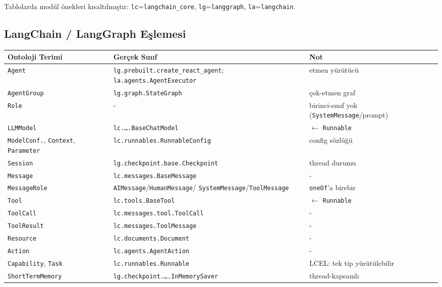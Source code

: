 \documentclass[10pt, a4paper, twocolumn]{article}
\begin{document}
\noindent Tablolarda modül önekleri kısaltılmıştır: \texttt{lc}=\texttt{langchain\_core}, \texttt{lg}=\texttt{langgraph}, \texttt{la}=\texttt{langchain}.

\subsection*{LangChain / LangGraph Eşlemesi}

\begin{center}
\tiny
\setlength{\tabcolsep}{3pt}
\begin{tabular}{|p{1.4cm}|p{3.4cm}|p{2.2cm}|}
\hline
\textbf{Ontoloji Terimi} & \textbf{Gerçek Sınıf} & \textbf{Not} \\
\hline
\texttt{Agent} & \texttt{lg.prebuilt.create\_react\_agent}; \texttt{la.agents.AgentExecutor} & etmen yürütücü \\
\hline
\texttt{AgentGroup} & \texttt{lg.graph.StateGraph} & çok-etmen graf \\
\hline
\texttt{Role} & {-} & birinci-sınıf yok (\texttt{SystemMessage}/prompt) \\
\hline
\texttt{LLMModel} & \texttt{lc.\dots.BaseChatModel} & $\leftarrow$ \texttt{Runnable} \\
\hline
\texttt{ModelConf.}, \texttt{Context}, \texttt{Parameter} & \texttt{lc.runnables.RunnableConfig} & config sözlüğü \\
\hline
\texttt{Session} & \texttt{lg.checkpoint.base.Checkpoint} & thread durumu \\
\hline
\texttt{Message} & \texttt{lc.messages.BaseMessage} & {-} \\
\hline
\texttt{MessageRole} & \texttt{AIMessage}/\texttt{HumanMessage}/ \texttt{SystemMessage}/\texttt{ToolMessage} & \texttt{oneOf}'a birebir \\
\hline
\texttt{Tool} & \texttt{lc.tools.BaseTool} & $\leftarrow$ \texttt{Runnable} \\
\hline
\texttt{ToolCall} & \texttt{lc.messages.tool.ToolCall} & {-} \\
\hline
\texttt{ToolResult} & \texttt{lc.messages.ToolMessage} & {-} \\
\hline
\texttt{Resource} & \texttt{lc.documents.Document} & {-} \\
\hline
\texttt{Action} & \texttt{lc.agents.AgentAction} & {-} \\
\hline
\texttt{Capability}, \texttt{Task} & \texttt{lc.runnables.Runnable} & LCEL: tek tip yürütülebilir \\
\hline
\texttt{ShortTermMemory} & \texttt{lg.checkpoint.\dots.InMemorySaver} & thread-kapsamlı \\

\end{tabular}
\end{center}
\end{document}
